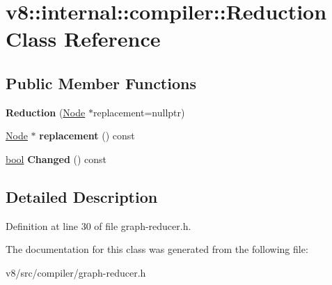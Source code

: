 \hypertarget{classv8_1_1internal_1_1compiler_1_1Reduction}{}\section{v8\+:\+:internal\+:\+:compiler\+:\+:Reduction Class Reference}
\label{classv8_1_1internal_1_1compiler_1_1Reduction}
\subsection*{Public Member Functions}
\begin{DoxyCompactItemize}
\item 
\mbox{\label{classv8_1_1internal_1_1compiler_1_1Reduction_a2ba0febe91e73cc23dbb3fe92aac3d9e}} 
{\bfseries Reduction} (\mbox{\hyperlink{classv8_1_1internal_1_1compiler_1_1Node}{Node}} $\ast$replacement=nullptr)
\item 
\mbox{\label{classv8_1_1internal_1_1compiler_1_1Reduction_aa1373292306156c567af7d4e4c0b4913}} 
\mbox{\hyperlink{classv8_1_1internal_1_1compiler_1_1Node}{Node}} $\ast$ {\bfseries replacement} () const
\item 
\mbox{\label{classv8_1_1internal_1_1compiler_1_1Reduction_a2bfcf38d71188ae9451959a503c0487b}} 
\mbox{\hyperlink{classbool}{bool}} {\bfseries Changed} () const
\end{DoxyCompactItemize}


\subsection{Detailed Description}


Definition at line 30 of file graph-\/reducer.\+h.



The documentation for this class was generated from the following file\+:\begin{DoxyCompactItemize}
\item 
v8/src/compiler/graph-\/reducer.\+h\end{DoxyCompactItemize}
